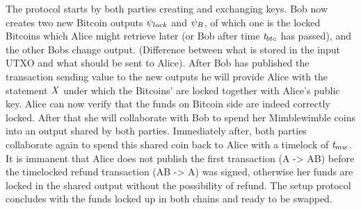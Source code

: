 The protocol starts by both parties creating and exchanging keys.
Bob now creates two new Bitcoin outputs $\psi_{lock}$ and $\psi_{B}$, of which one is the locked Bitcoins which Alice might retrieve later (or Bob after time $\mathit{t}_{btc}$ has passed), and the other Bobs change output. (Difference between what is stored in the input UTXO and what should be sent to Alice).
After Bob has published the transaction sending value to the new outputs he will provide Alice with the statement $\mathit{X}$ under which the Bitcoins' are locked together with Alice's public key.
Alice can now verify that the funds on Bitcoin side are indeed correctly locked.
After that she will collaborate with Bob to spend her Mimblewimble coins into an output shared by both parties.
Immediately after, both parties collaborate again to spend this shared coin back to Alice with a timelock of $\mathit{t}_{mw}$.
It is immanent that Alice does not publish the first transaction (A -> AB) before the timelocked refund transaction (AB -> A) was signed, otherwise her funds are locked in the shared output without the possibility of refund.
The setup protocol concludes with the funds locked up in both chains and ready to be swapped.

\footnotetext[1]{$\procSendCoins{\funArray{\varCoinInp}}{\funArray{\varBlindingFactorAlice}}{\varAmountMW}{\varValueMw}{\cnstFalsum}$}
\footnotetext[2]{$\procDRecvCoins{\varPreTx}{\varPreTx}$}
\footnotetext[3]{$\procDSendCoins{\funArray{\varCoinShared}}{\funArray{\funStar{\varBlindingFactorAlice}}}{\varAmountMW}{\varAmountMW}{\funArray{\funStar{\varBlindingFactorBob}}}{\varTimeMW}$}

